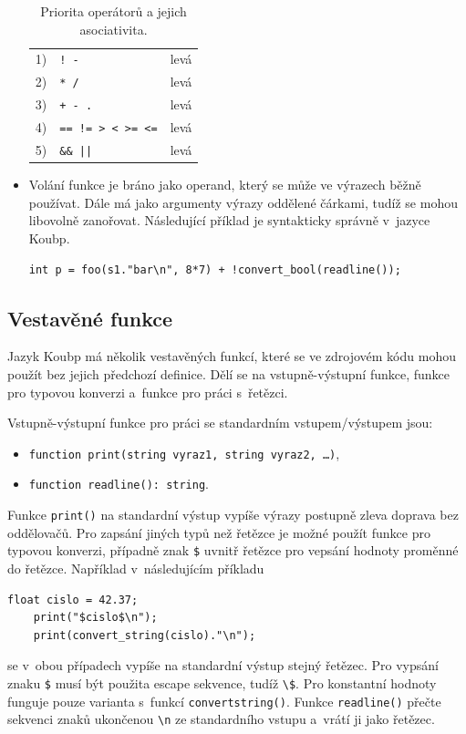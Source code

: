 \begin{itemize}
\begin{table}[ht]
\begin{tabularx}{0.7\textwidth}{p{}p{}X}
            \midrule
            1) & \texttt{! -} & levá \\
            2) & \texttt{* /} & levá \\
            3) & \texttt{+ - .} & levá \\
            4) & \texttt{== != > < >= <=} & levá \\
            5) & \texttt{\&\& ||} & levá \\
            \bottomrule
        \end{tabularx}
        \caption{Priorita operátorů a jejich asociativita.}
        \label{tab_priorita_operatoru}
    \end{table}
    \item Volání funkce je bráno jako operand, který se může ve výrazech běžně používat.
    Dále má jako argumenty výrazy oddělené čárkami, tudíž se mohou libovolně zanořovat.
    Následující příklad je syntakticky správně v~jazyce Koubp.
    \begin{lstlisting}[language=Koubp]
        int p = foo(s1."bar\n", 8*7) + !convert_bool(readline());
    \end{lstlisting}
\end{itemize}

\subsection*{Vestavěné funkce}
Jazyk Koubp má několik vestavěných funkcí, které se ve zdrojovém kódu mohou použít bez jejich předchozí definice.
Dělí se na vstupně-výstupní funkce, funkce pro typovou konverzi a~funkce pro práci s~řetězci.

Vstupně-výstupní funkce pro práci se standardním vstupem/výstupem jsou:
\begin{itemize}
    \item \texttt{function print(string vyraz1, string vyraz2, \ldots)},
    \item \texttt{function readline(): string}.
\end{itemize}
Funkce \texttt{print()} na standardní výstup vypíše výrazy postupně zleva doprava bez oddělovačů.
Pro zapsání jiných typů než řetězce je možné použít funkce pro typovou konverzi, případně znak \texttt{\$} uvnitř řetězce pro vepsání hodnoty proměnné do řetězce.
Například v~následujícím příkladu
\begin{lstlisting}[language=Koubp]
    float cislo = 42.37;
    print("$cislo$\n");
    print(convert_string(cislo)."\n");
\end{lstlisting}
se v~obou případech vypíše na standardní výstup stejný řetězec.
Pro vypsání znaku \texttt{\$} musí být použita escape sekvence, tudíž \texttt{\textbackslash\$}.
Pro konstantní hodnoty funguje pouze varianta s~funkcí \texttt{convert\textunderscore string()}.
Funkce \texttt{readline()} přečte sekvenci znaků ukončenou \texttt{\textbackslash n} ze standardního vstupu a~vrátí ji jako řetězec.

